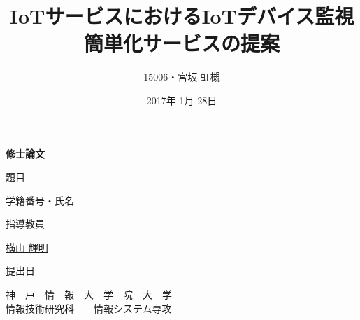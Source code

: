 \documentclass[a4paper]{jreport}
\begin{document}
\makeatletter

\title{IoTサービスにおけるIoTデバイス監視簡単化サービスの提案}
\author{15006・宮坂 虹槻}
\date{2017年 1月 28日}
\def\@teacher{横山 輝明}


\begin{titlepage}\begin{center}
\thispagestyle{plain}
{\Huge \textbf{修士論文} \par}
\vspace{1.5cm}
{\LARGE\gt 題目 \par}
{\LARGE\gt \underline{\@title} \par}
\vspace{2.5cm}
{\LARGE\gt 学籍番号・氏名 \par}
\vspace{1.5cm}
{\LARGE \underline{\@author} \par}
\vspace{1.5cm}
{\LARGE\gt 指導教員 \par}
\vspace{1.5cm}
{\LARGE\gt \underline{\@teacher} \par}
\vspace{1.5cm}
{\LARGE\gt 提出日 \par}
\vspace{1.5cm}
{\LARGE\gt \underline{\@date} \par}
\vspace{1.5cm}
{\Large\gt
神　戸　情　報　大　学　院　大　学\\
情報技術研究科　　情報システム専攻\\
\par}
\end{center}\end{titlepage}
\restoregeometry
\makeatother

\tableofcontents
\end{document}
